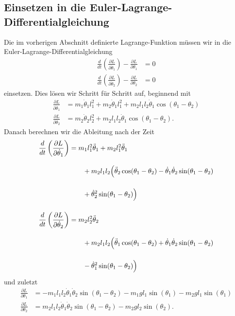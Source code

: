 \subsection{Einsetzen in die Euler-Lagrange-Differentialgleichung}
Die im vorherigen Abschnitt definierte Lagrange-Funktion müssen wir in
die Euler-Lagrange-Differentialgleichung
\begin{align}
    \label{eq:lag1}
    \frac{d}{dt} \left(\frac{\partial L}{\partial \dot{\theta}_1}\right) 
    - \frac{\partial L}{\partial \theta_1} &= 0\\
    \label{eq:lag2}
    \frac{d}{dt} \left(\frac{\partial L}{\partial \dot{\theta}_2}\right) 
    - \frac{\partial L}{\partial \theta_2} &= 0
\end{align}
einsetzen.
Dies lösen wir Schritt für Schritt auf, beginnend mit
\begin{align*}
    \frac{\partial L}{\partial \dot{\theta}_1} &= m_1 \dot{\theta}_1 l_1^2
    + m_2 \dot{\theta}_1 l_1^2 + m_2 l_1 l_2 \dot{\theta}_1
    \cos(\theta_1-\theta_2)\\
    \frac{\partial L}{\partial \dot{\theta}_2} &= m_2 \dot{\theta}_2 l_2^2
    + m_2 l_1 l_2 \dot{\theta}_1 \cos(\theta_1-\theta_2).
\end{align*}
Danach berechnen wir die Ableitung nach der Zeit
\begin{align*}
    \frac{d}{dt} \left(\frac{\partial L}{\partial \dot{\theta}_1}\right) &=
    m_1 l_1^2 \ddot{\theta}_1 + m_2 l_1^2 \ddot{\theta}_1\\
    \shortintertext{}
    & \qquad + m_2 l_1 l_2 \Bigl(\ddot{\theta}_2\cos(\theta_1-\theta_2)-
    \dot{\theta}_1 \dot{\theta}_2 \sin(\theta_1-\theta_2)\\
    \shortintertext{}
    & \qquad + \dot{\theta}_2^2 \sin(\theta_1-\theta_2)\Bigr)\\
    \shortintertext{}
    \frac{d}{dt} \left(\frac{\partial L}{\partial \dot{\theta}_2}\right) &=
    m_2 l_2^2 \ddot{\theta}_2\\
    \shortintertext{}
    & \qquad + m_2 l_1 l_2 \Bigl(\ddot{\theta}_1\cos(\theta_1-\theta_2)+
    \dot{\theta}_1 \dot{\theta}_2 \sin(\theta_1-\theta_2)\\
    \shortintertext{}
    & \qquad - \dot{\theta}_1^2 \sin(\theta_1-\theta_2)\Bigr)
\end{align*}
und zuletzt
\begin{align*}
    \frac{\partial L}{\partial {\theta}_1} &= -m_1 l_1 l_2 \dot{\theta}_1
    \dot{\theta}_2 \sin(\theta_1-\theta_2) - m_1 g l_1 \sin(\theta_1)
    - m_2 g l_1 \sin(\theta_1)\\
    \frac{\partial L}{\partial {\theta}_2} &= m_2 l_1 l_2 \dot{\theta}_1
    \dot{\theta}_2 \sin(\theta_1-\theta_2) - m_2 g l_2 \sin(\theta_2).
\end{align*}
